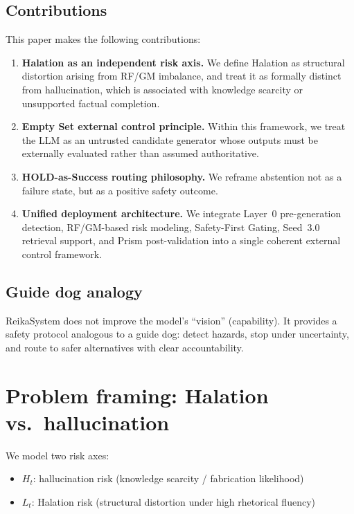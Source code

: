 \documentclass[11pt,a4paper]{article}
\begin{document}
\subsection{Contributions}
This paper makes the following contributions:
\begin{enumerate}
\item \textbf{Halation as an independent risk axis.} We define Halation as structural distortion
arising from RF/GM imbalance, and treat it as formally distinct from hallucination, which
is associated with knowledge scarcity or unsupported factual completion.

\item \textbf{Empty Set external control principle.} Within this framework, we treat the LLM as
an untrusted candidate generator whose outputs must be externally evaluated rather than
assumed authoritative.

\item \textbf{HOLD-as-Success routing philosophy.} We reframe abstention not as a failure state,
but as a positive safety outcome.

\item \textbf{Unified deployment architecture.} We integrate Layer~0 pre-generation detection,
RF/GM-based risk modeling, Safety-First Gating, Seed~3.0 retrieval support, and Prism
post-validation into a single coherent external control framework.
\end{enumerate}

\subsection{Guide dog analogy}
ReikaSystem does not improve the model's ``vision'' (capability). It provides a safety protocol
analogous to a guide dog: detect hazards, stop under uncertainty, and route to safer alternatives
with clear accountability.

\section{Problem framing: Halation vs.\ hallucination}

We model two risk axes:
\begin{itemize}
\item $H_t$: hallucination risk (knowledge scarcity / fabrication likelihood)
\item $L_t$: Halation risk (structural distortion under high rhetorical fluency)
\end{itemize}
\end{document}

